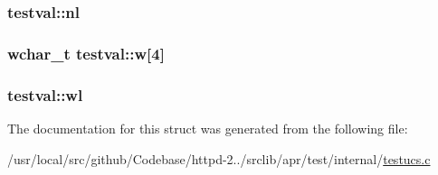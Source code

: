 \subsubsection[{\texorpdfstring{nl}{nl}}]{ testval\+::nl}\hypertarget{structtestval_a63d4f8e471e3dd98ff291337323ccd42}{}\label{structtestval_a63d4f8e471e3dd98ff291337323ccd42}
\subsubsection[{\texorpdfstring{w}{w}}]{\setlength{\rightskip}{0pt plus 5cm}wchar\+\_\+t testval\+::w\mbox{[}4\mbox{]}}\hypertarget{structtestval_aa0cd801062d92ef17707e77469397a51}{}\label{structtestval_aa0cd801062d92ef17707e77469397a51}
\subsubsection[{\texorpdfstring{wl}{wl}}]{ testval\+::wl}\hypertarget{structtestval_a61e60484d4f9aeacab5e4acc3d30312d}{}\label{structtestval_a61e60484d4f9aeacab5e4acc3d30312d}


The documentation for this struct was generated from the following file\+:\begin{DoxyCompactItemize}
\item 
/usr/local/src/github/\+Codebase/httpd-\/2../srclib/apr/test/internal/\hyperlink{testucs_8c}{testucs.\+c}\end{DoxyCompactItemize}
